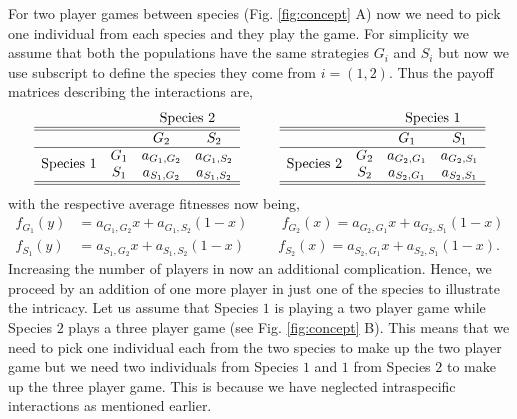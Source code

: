 \documentclass[12pt]{article}
\begin{document}
For two player games between species (Fig. \ref{fig:concept} A)  now we need to pick one individual from each species and they play the game.
For simplicity we assume that both the populations have the same strategies $G_i$ and $S_i$ but now we use subscript to define the species they come from $i = (1,2)$. 
Thus the payoff matrices describing the interactions
are,
\begin{equation}\label{}
\begin{array}{cccc}
& & \multicolumn{2}{c}{\text{Species 2}}\\
\hline\hline
&	&	G_2		&	S_2	\\
\hline
 \multirow{2}{*}{Species 1} & G_1 	& a_{G_1,G_2} &	a_{G_1,S_2} \\
&	S_1	&  a_{S_1,G_2} & a_{S_1,S_2} \\
 \hline\hline
\end{array}
\hspace{1cm}
\begin{array}{cccc}
& & \multicolumn{2}{c}{\text{Species 1}}\\
\hline\hline
&	&	G_1		&	S_1	\\
\hline
 \multirow{2}{*}{Species 2} & G_2 	& a_{G_2,G_1} &	a_{G_2,S_1} \\
&	S_2	&  a_{S_2,G_1} & a_{S_2,S_1} \nonumber \\
 \hline\hline
\end{array}
\end{equation}
with the respective average fitnesses now being,
\begin{eqnarray}
f_{G_1} (y) &= a_{G_1,G_2} x + a_{G_1,S_2} (1-x) \hspace{1cm} f_{G_2} (x) = a_{G_2,G_1} x + a_{G_2,S_1} (1-x)\nonumber \\
f_{S_1} (y) &= a_{S_1,G_2} x + a_{S_1,S_2} (1-x) \hspace{1cm} f_{S_2} (x) = a_{S_2,G_1} x + a_{S_2,S_1} (1-x) .\nonumber
\end{eqnarray}
Increasing the number of players in now an additional complication. 
Hence, we proceed by an addition of one more player in just one of the species to illustrate the intricacy.
Let us assume that Species $1$ is playing a two player game while Species $2$ plays a three player game (see Fig. \ref{fig:concept} B).
This means that we need to pick one individual each from the two species to make up the two player game but we need two individuals from Species $1$ and $1$ from Species $2$ to make up the three player game.
This is because we have neglected intraspecific interactions as mentioned earlier.
\end{document}
